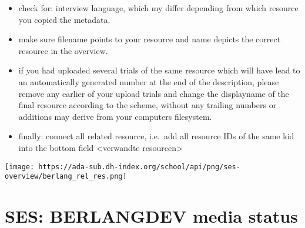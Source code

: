 \documentclass[
  12pt,
]{article}
\providecommand{\tightlist}{%
  \setlength{\itemsep}{0pt}\setlength{\parskip}{0pt}}
\begin{document}
\begin{itemize}
\tightlist
\item
  check for: interview language, which my differ depending from which
  resource you copied the metadata.
\item
  make sure filename points to your resource and name depicts the
  correct resource in the overview.
\item
  if you had uploaded several trials of the same resource which will
  have lead to an automatically generated number at the end of the
  description, please remove any earlier of your upload trials and
  change the displayname of the final resource according to the scheme,
  without any trailing numbers or additions may derive from your
  computers filesystem.
\item
  finally: connect all related resource, i.e.~add all resource IDs of
  the same kid into the bottom field \textless verwandte
  resourcen\textgreater{}
\end{itemize}

\texttt{[image: https://ada-sub.dh-index.org/school/api/png/ses-overview/berlang\_rel\_res.png]}

\hypertarget{ses-berlangdev-media-status}{%
\section{SES: BERLANGDEV media
status}\label{ses-berlangdev-media-status}}
\end{document}

